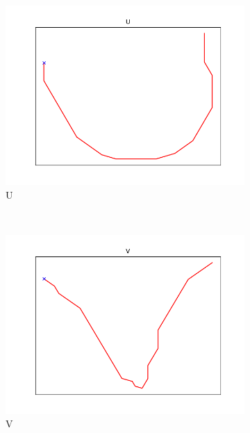 \begin{figure}
\begin{subfigure}[b]{0.14\textwidth}
        \includegraphics[width=\textwidth]{images/gbem/letters_generated/U.png}
        \caption{U}
    \end{subfigure}
    ~
    \begin{subfigure}[b]{0.14\textwidth}
        \includegraphics[width=\textwidth]{images/gbem/letters_generated/V.png}
        \caption{V}
    \end{subfigure}
    ~
    \begin{subfigure}[b]{0.14\textwidth}

\end{subfigure}
\end{figure}
